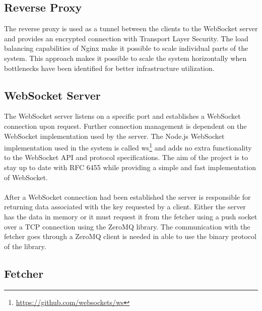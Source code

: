 \subsection{Reverse Proxy}

The reverse proxy is used as a tunnel between the clients to the WebSocket server and provides an encrypted connection with Transport Layer Security. The load balancing capabilities of Nginx make it possible to scale individual parts of the system. This approach makes it possible to scale the system horizontally when bottlenecks have been identified for better infrastructure utilization.


\subsection{WebSocket Server}

The WebSocket server listens on a specific port and establishes a WebSocket connection upon request. Further connection management is dependent on the WebSocket implementation used by the server. The Node.js WebSocket implementation used in the system is called ws\footnote{\url{https://github.com/websockets/ws}} and adds no extra functionality to the WebSocket API and protocol specifications. The aim of the project is to stay up to date with RFC 6455 while providing a simple and fast implementation of WebSocket.
\\ \\
After a WebSocket connection had been established the server is responsible for returning data associated with the key requested by a client. Either the server has the data in memory or it must request it from the fetcher using a push socket over a TCP connection using the ZeroMQ library. The communication with the fetcher goes through a ZeroMQ client is needed in able to use the binary protocol of the library.

\subsection{Fetcher}

